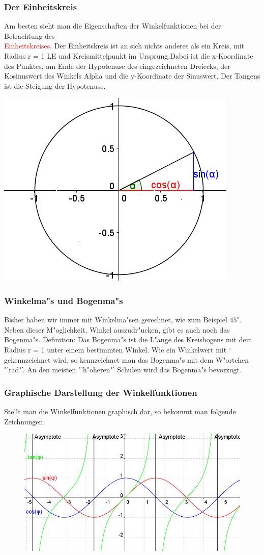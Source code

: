 \subsubsection{Der Einheitskreis}
\begin{minipage}{9 cm}
Am besten sieht man die Eigenschaften der Winkelfunktionen bei der Betrachtung des\\ \textcolor{red}{Einheitskreises}. Der Einheitskreis ist an sich nichts anderes als ein Kreis, mit Radius r = 1 LE und Kreismittelpunkt im Ursprung.Dabei ist die x-Koordinate des Punktes, am Ende der Hypotenuse des eingezeichneten Dreiecks, der Kosinuswert des Winkels Alpha und die y-Koordinate der Sinuswert. Der Tangens ist die Steigung der Hypotenuse.
\end{minipage}
\begin{minipage}{4 cm}
\includegraphics[width = 4 cm]{pictures/Einheitskreis}
\end{minipage}




\subsubsection{Winkelma"s und Bogenma"s}
Bisher haben wir immer mit Winkelma"sen gerechnet, wie zum Beispiel $45^\circ$. Neben dieser M"oglichkeit, Winkel auszudr"ucken, gibt es auch noch das Bogenma"s.
Definition: Das Bogenma"s ist die L"ange des Kreisbogens mit dem Radius r = 1 unter einem bestimmten Winkel.
Wie ein Winkelwert mit $^\circ$ gekennzeichnet wird, so kennzeichnet man das Bogenma"s mit dem W"ortchen "'rad"'.
An den meisten "'h"oheren"' Schulen wird das Bogenma"s bevorzugt.

\subsubsection{Graphische Darstellung der Winkelfunktionen}
Stellt man die Winkelfunktionen graphisch dar, so bekommt man folgende Zeichnungen.
\begin{center}
\begin{figure}[h!]
\includegraphics[width = 13 cm, height = 5 cm]{pictures/Winkelfunktionen}
\end{figure}
\end{center}

